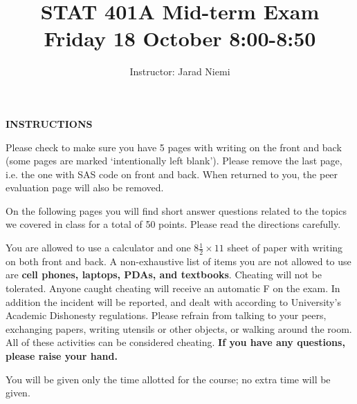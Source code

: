 \documentclass[10pt]{article}
\title{STAT 401A Mid-term Exam \\ Friday 18 October 8:00-8:50}
\author{Instructor: Jarad Niemi}
\date{}
\begin{document}
\maketitle


\bigskip


\textbf{INSTRUCTIONS}

\bigskip

Please check to make sure you have 5 pages with writing on the front and back (some pages are marked `intentionally left blank'). Please remove the last page, i.e. the one with SAS code on front and back. When returned to you, the peer evaluation page will also be removed.

\bigskip

On the following pages you will find short answer questions related to the topics we covered in class for a total of 50 points. Please read the directions carefully.

\bigskip

You are allowed to use a calculator and one $8\frac{1}{2}\times 11$ sheet of paper with writing on both front and back. A non-exhaustive list of items you are not allowed to use are {\bf cell phones, laptops, PDAs, and textbooks}. Cheating will not be tolerated. Anyone caught cheating will receive an automatic F on the exam. In addition the incident will be reported, and dealt with according to University's Academic Dishonesty regulations. Please refrain from talking to your peers, exchanging papers, writing utensils or other objects, or walking around the room. All of these activities can be considered cheating. {\bf If you have any questions, please raise your hand.}

\bigskip

You will be given only the time allotted for the course; no extra time will be given.

\bigskip
\end{document}
